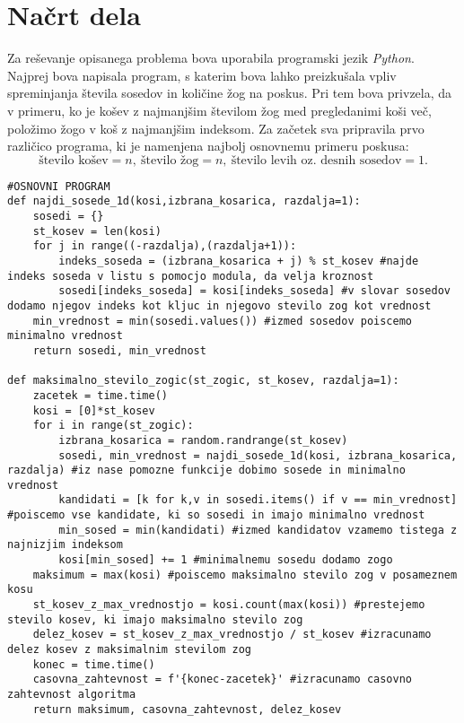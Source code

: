 \documentclass[a4paper, 11pt]{article}
\begin{document}
\section{Načrt dela}
Za reševanje opisanega problema bova uporabila programski jezik \emph{Python}. Najprej bova napisala program, s katerim bova
lahko preizkušala vpliv spreminjanja števila sosedov in količine žog na poskus. Pri tem bova privzela, da v primeru, ko je  
košev z najmanjšim številom žog med pregledanimi koši več, položimo žogo v koš z najmanjšim indeksom. Za začetek sva
pripravila prvo različico programa, ki je namenjena najbolj osnovnemu primeru poskusa:
$$ \text{število košev} = n,\  \text{število žog} = n, \ \text{število levih oz.\ desnih sosedov} = 1 .$$

\pagebreak

\begin{verbatim}
#OSNOVNI PROGRAM
def najdi_sosede_1d(kosi,izbrana_kosarica, razdalja=1):
    sosedi = {}
    st_kosev = len(kosi)
    for j in range((-razdalja),(razdalja+1)):
        indeks_soseda = (izbrana_kosarica + j) % st_kosev #najde indeks soseda v listu s pomocjo modula, da velja kroznost
        sosedi[indeks_soseda] = kosi[indeks_soseda] #v slovar sosedov dodamo njegov indeks kot kljuc in njegovo stevilo zog kot vrednost
    min_vrednost = min(sosedi.values()) #izmed sosedov poiscemo minimalno vrednost
    return sosedi, min_vrednost

def maksimalno_stevilo_zogic(st_zogic, st_kosev, razdalja=1):
    zacetek = time.time()
    kosi = [0]*st_kosev
    for i in range(st_zogic):
        izbrana_kosarica = random.randrange(st_kosev) 
        sosedi, min_vrednost = najdi_sosede_1d(kosi, izbrana_kosarica, razdalja) #iz nase pomozne funkcije dobimo sosede in minimalno vrednost
        kandidati = [k for k,v in sosedi.items() if v == min_vrednost] #poiscemo vse kandidate, ki so sosedi in imajo minimalno vrednost
        min_sosed = min(kandidati) #izmed kandidatov vzamemo tistega z najnizjim indeksom
        kosi[min_sosed] += 1 #minimalnemu sosedu dodamo zogo
    maksimum = max(kosi) #poiscemo maksimalno stevilo zog v posameznem kosu
    st_kosev_z_max_vrednostjo = kosi.count(max(kosi)) #prestejemo stevilo kosev, ki imajo maksimalno stevilo zog
    delez_kosev = st_kosev_z_max_vrednostjo / st_kosev #izracunamo delez kosev z maksimalnim stevilom zog
    konec = time.time()
    casovna_zahtevnost = f'{konec-zacetek}' #izracunamo casovno zahtevnost algoritma
    return maksimum, casovna_zahtevnost, delez_kosev
\end{verbatim}
\end{document}
